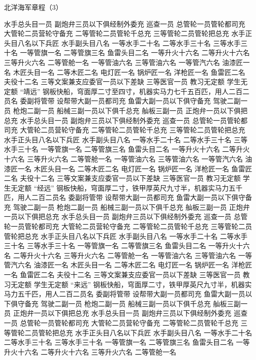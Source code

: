 \documentclass[12pt,UTF8]{ctexbook}
\begin{document}
北洋海军章程（3）

水手总头目一员
副炮弁三员以下俱经制外委充
巡查一员
总管轮一员管轮都司充
大管轮二员营轮守备充
二等管轮二员管轮千总充
三等管轮二员管轮把总充
水手正头目八名以下兵匠
水手副头目八名
一等水手二十名
二等水手三十名
三等水手三十名
一等管旗一名
二等管旗三名
鱼雷头目二名
一等升火十六名
二等升火十六名
三等升火六名
二等管舱一名
一等管油六名
三等管油六名
一等管汽六名
油漆匠一名
木匠头目一名
二等木匠二名
电灯匠一名
锅炉匠一名
洋枪匠一名
鱼雷匠二名
夫役十二名
三等文案兼支应委官一员以下差缺
三等医官一员
教习无定额
学生无定额
“靖远”
钢板快船，穹面厚二寸至四寸，机器实马力七千五百匹，用人二百二员名
委副将管带
设帮带大副一员都司充
鱼雷大副一员以下俱守备充
驾驶二副一员
枪炮二副一员
船械三副一员以下俱千总充
舢板三副一员
正炮弁一员以下俱把总充
水手总头目一员
副炮弁三员以下俱经制外委充
巡查一员
总管轮一员管轮都司充
大管轮二员营轮守备充
二等管轮二员管轮千总充
三等管轮二员管轮把总充
水手正头目八名以下兵匠
水手副头目八名
一等水手二十名
二等水手三十名
三等水手三十名
一等管旗一名
二等管旗三名
鱼雷头目二名
一等升火十六名
二等升火十六名
三等升火六名
二等管舱一名
一等管油六名
三等管油六名
一等管汽六名
油漆匠一名
木匠头目一名
二等木匠二名
电灯匠一名
锅炉匠一名
洋枪匠一名
鱼雷匠二名
夫役十二名
三等文案兼支应委官一员以下差缺
三等医官一员
教习无定额
学生无定额
“经远”
钢板快船，穹面厚二寸，铁甲厚英尺九寸半，机器实马力五千匹，用人二百二员名
委副将管带
设帮带大副一员都司充
鱼雷大副一员以下俱守备充
驾驶二副一员
枪炮二副一员
船械三副一员以下俱千总充
舢板三副一员
正炮弁一员以下俱把总充
水手总头目一员
副炮弁三员以下俱经制外委充
巡查一员
总管轮一员管轮都司充
大管轮二员营轮守备充
二等管轮二员管轮千总充
三等管轮二员管轮把总充
水手正头目八名以下兵匠
水手副头目八名
一等水手二十名
二等水手三十名
三等水手三十名
一等管旗一名
二等管旗三名
鱼雷头目二名
一等升火十六名
二等升火十六名
三等升火六名
二等管舱一名
一等管油六名
三等管油六名
一等管汽六名
油漆匠一名
木匠头目一名
二等木匠二名
电灯匠一名
锅炉匠一名
洋枪匠一名
鱼雷匠二名
夫役十二名
三等文案兼支应委官一员以下差缺
三等医官一员
教习无定额
学生无定额
“来远”
钢板快船，穹面厚二寸，铁甲厚英尺九寸半，机器实马力五千匹，用人二百二员名
委副将管带
设帮带大副一员都司充
鱼雷大副一员以下俱守备充
驾驶二副一员
枪炮二副一员
船械三副一员以下俱千总充
舢板三副一员
正炮弁一员以下俱把总充
水手总头目一员
副炮弁三员以下俱经制外委充
巡查一员
总管轮一员管轮都司充
大管轮二员营轮守备充
二等管轮二员管轮千总充
三等管轮二员管轮把总充
水手正头目八名以下兵匠
水手副头目八名
一等水手二十名
二等水手三十名
三等水手三十名
一等管旗一名
二等管旗三名
鱼雷头目二名
一等升火十六名
二等升火十六名
三等升火六名
二等管舱一名
\end{document}
